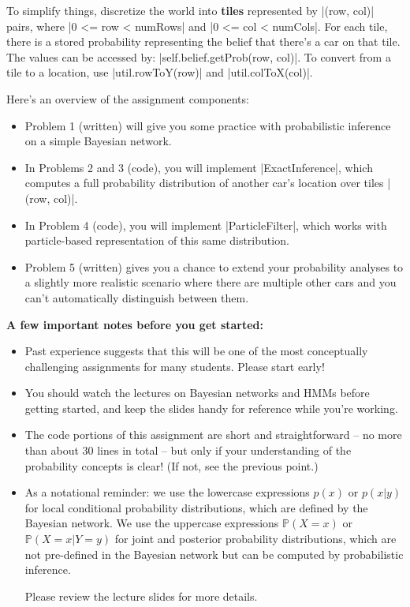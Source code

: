 To simplify things, discretize the world into {\bf tiles} represented by
|(row, col)| pairs, where |0 <= row < numRows| and |0 <= col < numCols|. For
each tile, there is a stored probability representing the belief that there's a car on
that tile. The values can be accessed by: |self.belief.getProb(row, col)|. To
convert from a tile to a location, use |util.rowToY(row)| and
|util.colToX(col)|.

Here's an overview of the assignment components:
  
\begin{itemize}
  \item Problem 1 (written) will give you some practice with probabilistic
  inference on a simple Bayesian network.
  \item In Problems 2 and 3 (code), you will implement |ExactInference|, which
  computes a full probability distribution of another car's location over tiles
  |(row, col)|.
  \item In Problem 4 (code), you will implement |ParticleFilter|, which works
  with particle-based representation of this same distribution.
  \item Problem 5 (written) gives you a chance to extend your probability analyses
  to a slightly more realistic scenario where there are multiple other cars and
  you can't automatically distinguish between them.
\end{itemize}
\clearpage

{\bf A few important notes before you get started: }  

\begin{itemize}
\item Past experience suggests that this will be one of the most conceptually
  challenging assignments for many students.  Please start early!
\item You should watch the lectures on Bayesian
networks and HMMs before getting started, and keep the slides handy for
reference while you're working.
\item The code portions of this assignment are short and straightforward -- no
more than about 30 lines in total -- but only if your understanding of the
probability concepts is clear!  (If not, see the previous point.)
\item As a notational reminder: we use the lowercase expressions $p(x)$ or
$p(x\vert y)$ for local conditional probability distributions, which are defined by
the Bayesian network.  We use the uppercase expressions $\mathbb P(X = x)$ or
$\mathbb P(X = x \vert Y = y)$ for joint and posterior probability distributions,
which are not pre-defined in the Bayesian network but can be computed by
probabilistic inference.

Please review the lecture slides for more details.
\end{itemize}

